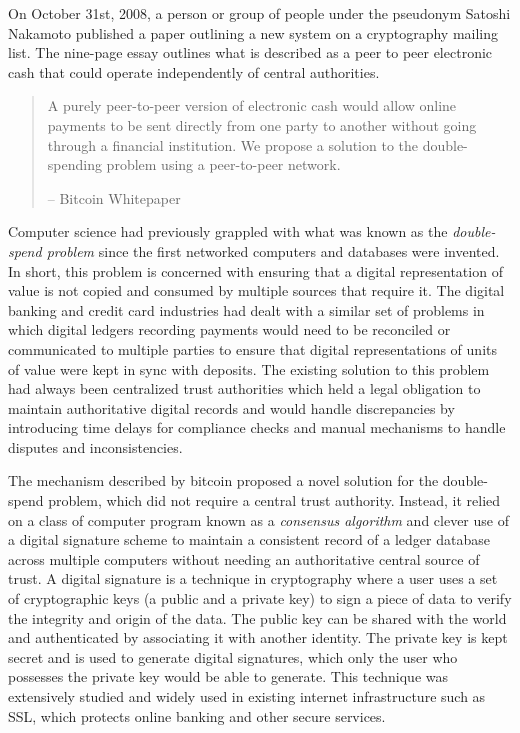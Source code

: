 
On October 31st, 2008, a person or group of people under the pseudonym Satoshi
Nakamoto published \cite{nakamoto_bitcoin_2008} a paper outlining a new system on a
cryptography mailing list. The nine-page essay outlines what is described as a
peer to peer electronic cash that could operate independently of central
authorities.


\begin{quote}
A purely peer-to-peer version of electronic cash would allow online
payments to be sent directly from one party to another without going
through a financial institution. We propose a solution to the
double-spending problem using a peer-to-peer network.
\begin{flushright}
-- Bitcoin Whitepaper
\end{flushright}
\end{quote}

Computer science had previously grappled with what was known as the
\textit{double-spend problem} since the first networked computers and databases
were invented. In short, this problem is concerned with ensuring that a digital
representation of value is not copied and consumed by multiple sources that
require it. The digital banking and credit card industries had dealt with a
similar set of problems in which digital ledgers recording payments would need
to be reconciled or communicated to multiple parties to ensure that digital
representations of units of value were kept in sync with deposits. The existing
solution to this problem had always been centralized trust authorities which
held a legal obligation to maintain authoritative digital records and would
handle discrepancies by introducing time delays for compliance checks and manual
mechanisms to handle disputes and inconsistencies.


The mechanism described by bitcoin proposed a novel solution for the
double-spend problem, which did not require a central trust authority. Instead,
it relied on a class of computer program known as a \textit{consensus algorithm}
and clever use of a digital signature scheme to maintain a consistent record of
a ledger database across multiple computers without needing an authoritative
central source of trust. A digital signature is a technique in cryptography
where a user uses a set of cryptographic keys (a public and a private key) to
sign a piece of data to verify the integrity and origin of the data. The public
key can be shared with the world and authenticated by associating it with
another identity. The private key is kept secret and is used to generate digital
signatures, which only the user who possesses the private key would be able to
generate. This technique was extensively studied and widely used in existing
internet infrastructure such as SSL, which protects online banking and other
secure services.

